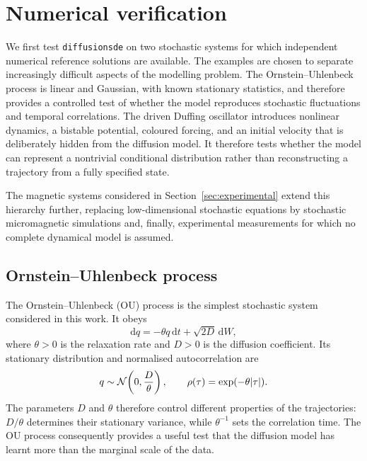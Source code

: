 
\section{Numerical verification}
\label{sec:numerical}

We first test \texttt{diffusionsde} on two stochastic systems for which independent numerical reference solutions are available. The examples are chosen to separate increasingly difficult aspects of the modelling problem. The Ornstein--Uhlenbeck process is linear and Gaussian, with known stationary statistics, and therefore provides a controlled test of whether the model reproduces stochastic fluctuations and temporal correlations. The driven Duffing oscillator introduces nonlinear dynamics, a bistable potential, coloured forcing, and an initial velocity that is deliberately hidden from the diffusion model. It therefore tests whether the model can represent a nontrivial conditional distribution rather than reconstructing a trajectory from a fully specified state.

The magnetic systems considered in Section~\ref{sec:experimental} extend this hierarchy further, replacing low-dimensional stochastic equations by stochastic micromagnetic simulations and, finally, experimental measurements for which no complete dynamical model is assumed.

\subsection{Ornstein--Uhlenbeck process}
\label{ssec:ou}

The Ornstein--Uhlenbeck (OU) process \cite{uhlenbeck1930} is the simplest stochastic system considered in this work. It obeys
\begin{equation}
    \mathrm{d}q
    =
    -\theta q\,\mathrm{d}t
    +
    \sqrt{2D}\,\mathrm{d}W,
    \label{eq:ou}
\end{equation}
where $\theta>0$ is the relaxation rate and $D>0$ is the diffusion coefficient. Its stationary distribution and normalised autocorrelation are
\begin{equation}
    q
    \sim
    \mathcal{N}\!\left(0,\frac{D}{\theta}\right),
    \qquad
    \rho(\tau)
    =
    \exp(-\theta|\tau|).
    \label{eq:ou_continuous_stationary}
\end{equation}
The parameters $D$ and $\theta$ therefore control different properties of the trajectories: $D/\theta$ determines their stationary variance, while $\theta^{-1}$ sets the correlation time. The OU process consequently provides a useful test that the diffusion model has learnt more than the marginal scale of the data.

